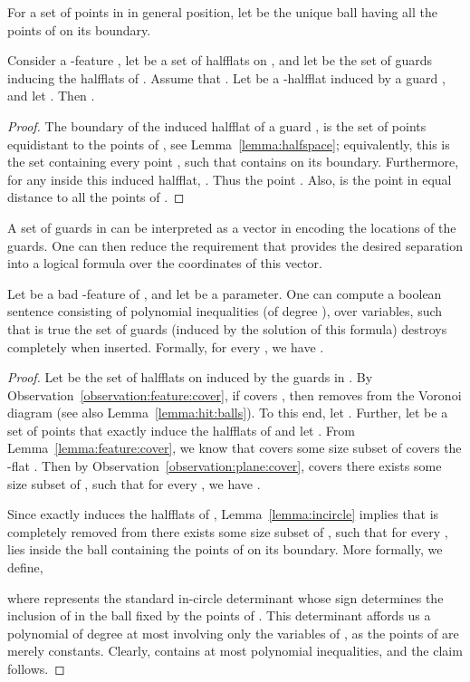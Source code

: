 \InSubmitVer{\documentclass[11pt]{article}}
\numberwithin{figure}{section}
\numberwithin{table}{section}
\numberwithin{equation}{section}
\newcommand{\lemlab}[1]{\label{lemma:#1}}
\newcommand{\lemref}[1]{Lemma~\ref{lemma:#1}}
\newcommand{\obsref}[1]{Observation~\ref{observation:#1}}
\begin{document}
For a set  of  points in  in general position,
let  be the unique ball having all the points
of  on its boundary.



\begin{lemma}
    \lemlab{incircle}Consider a -feature , let  be a set of halfflats
    on , and let  be the set of guards
    inducing the halfflats of . Assume that .  Let  be a
    -halfflat induced by a guard , and let .  Then   .
\end{lemma}

\begin{proof}
    The boundary of the induced halfflat of a guard , is the set
    of points equidistant to the points of , see \lemref{halfspace}; equivalently, this is the set
    containing every point , such that  contains  on its boundary. Furthermore, for any
     inside this induced halfflat, . Thus   the point . Also,  is the
    point in equal distance to all the points of
    .
\end{proof}

A set  of  guards in  can be interpreted as a
vector in  encoding the locations of the guards. One can
then reduce the requirement that  provides the desired
separation into a logical formula over the coordinates of this vector.



\begin{lemma}
    \lemlab{annihilate:feature}Let  be a bad -feature of , and let  be a parameter. One
    can compute a boolean sentence 
    consisting of  polynomial inequalities (of degree
    ), over  variables, such that
     is true  the set of 
    guards  (induced by the solution of this formula)
    destroys  completely when inserted. Formally, for every
    , we have .
\end{lemma}

\begin{proof}
    Let 
    be the set of halfflats on  induced by the
    guards in . By \obsref{feature:cover}, if  covers
    , then  removes  from the Voronoi
    diagram (see also \lemref{hit:balls}). To this end, let . Further, let  be a
    set of  points that exactly induce the halfflats of  and let . From \lemref{feature:cover}, we know that  covers
      some size  subset of  covers the
    -flat . Then by \obsref{plane:cover}, 
    covers   there exists some size  subset
     of , such that for every , we have
    .
    
    Since  exactly induces the halfflats of ,
    \lemref{incircle} implies that  is completely removed
    from   there exists some size
     subset  of , such that for every
    ,  lies inside the ball containing the
    points of  on
    its boundary. More formally, we define,
    
    where  represents the standard in-circle
    determinant whose sign determines the inclusion of  in the
    ball fixed by the points of . This determinant affords us a
    polynomial of degree at most  involving only the variables of
    , as the points of  are merely
    constants.  Clearly,  contains at
    most  polynomial inequalities, and
    the claim follows.
\end{proof}
\end{document}
